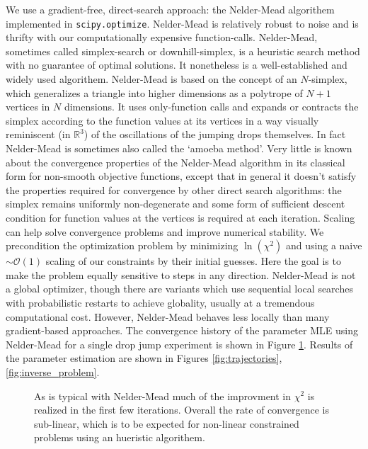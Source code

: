 \documentclass[12pt,a4paper,oneside]{book}
\begin{document}
We use a gradient-free, direct-search approach: the Nelder-Mead\cite{nelder_simplex_1965} algorithem implemented in \verb|scipy.optimize|. Nelder-Mead is relatively robust to noise and is thrifty with our computationally expensive function-calls. Nelder-Mead, sometimes called simplex-search or downhill-simplex, is a heuristic search method with no guarantee of optimal solutions. It nonetheless is a well-established and widely used algorithem. Nelder-Mead is based on the concept of an $N$-simplex, which generalizes a triangle into higher dimensions as a polytrope of $N + 1$ vertices in $N$ dimensions. It uses only-function calls and expands or contracts the simplex according to the function values at its vertices in a way visually reminiscent (in $\mathbb{R}^3$) of the oscillations of the jumping drops themselves. In fact Nelder-Mead is sometimes also called the `amoeba method'. Very little is known about the convergence properties of the Nelder-Mead algorithm in its classical form for non-smooth objective functions\cite{price_convergent_2002}, except that in general it doesn't satisfy the properties required for convergence by other direct search algorithms: the simplex remains uniformly non-degenerate and some form of sufficient descent condition for function values at the vertices is required at each iteration. Scaling can help solve convergence problems and improve numerical stability. We precondition the optimization problem by minimizing $\ln(\chi^2)$ and using a naive $\sim \mathcal{O}(1)$ scaling of our constraints by their initial guesses. Here the goal is to make the problem equally sensitive to steps in any direction. Nelder-Mead is not a global optimizer, though there are variants which use sequential local searches with probabilistic restarts to achieve globality, usually at a tremendous computational cost. However, Nelder-Mead behaves less locally than many gradient-based approaches. The convergence history of the parameter MLE using Nelder-Mead for a single drop jump experiment is shown in Figure \ref{fig:convergence}. Results of the parameter estimation are shown in Figures \ref{fig:trajectories}, \ref{fig:inverse_problem}.

\begin{figure}[h]
    \centering
    
    \caption{As is typical with Nelder-Mead much of the improvment in $\chi^2$ is realized in the first few iterations. Overall the rate of convergence is sub-linear, which is to be expected for non-linear constrained problems using an hueristic algorithem.\label{fig:convergence}}
\end{figure}
\end{document}
